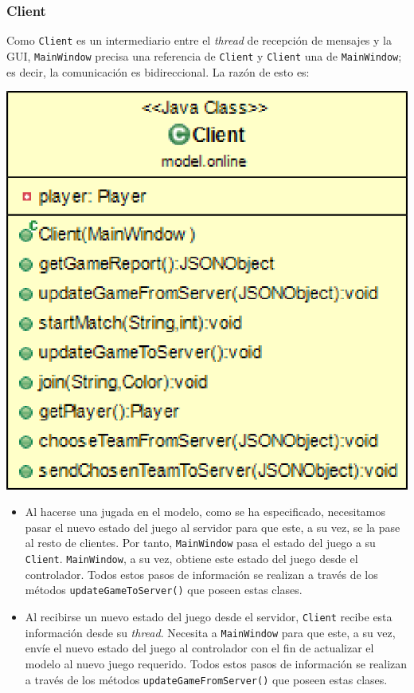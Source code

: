 \documentclass[../DocumentoOficial.tex]{subfiles}
\begin{document}
\subsubsection{Client}
Como \texttt{Client} es un intermediario entre el \textit{thread} de recepción de mensajes y la GUI, \texttt{MainWindow} precisa una referencia de \texttt{Client} y \texttt{Client} una de \texttt{MainWindow}; es decir, la comunicación es bidireccional. La razón de esto es:

\begin{center}
\includegraphics[scale=0.3]{Client-sprint7.png} 
\end{center}

\begin{itemize}
\item Al hacerse una jugada en el modelo, como se ha especificado, necesitamos pasar el nuevo estado del juego al servidor para que este, a su vez, se la pase al resto de clientes. Por tanto, \texttt{MainWindow} pasa el estado del juego a su \texttt{Client}. \texttt{MainWindow}, a su vez, obtiene este estado del juego desde el controlador. Todos estos pasos de información se realizan a través de los métodos \texttt{updateGameToServer()} que poseen estas clases.

\item Al recibirse un nuevo estado del juego desde el servidor, \texttt{Client} recibe esta información desde su \textit{thread}. Necesita a \texttt{MainWindow} para que este, a su vez, envíe el nuevo estado del juego al controlador con el fin de actualizar el modelo al nuevo juego requerido. Todos estos pasos de información se realizan a través de los métodos \texttt{updateGameFromServer()} que poseen estas clases.
\end{itemize}
\end{document}
